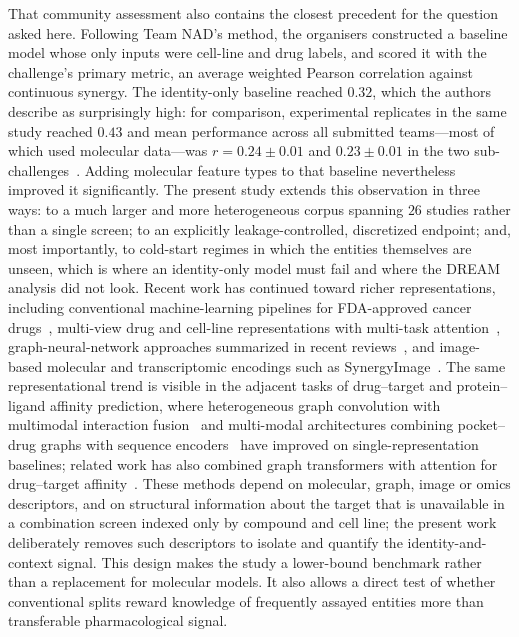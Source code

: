 \documentclass[11pt]{article}
\begin{document}
That community assessment also contains the closest precedent for the question asked here. Following
Team NAD's method, the organisers constructed a baseline model whose only inputs were cell-line and
drug labels, and scored it with the challenge's primary metric, an average weighted Pearson correlation
against continuous synergy. The identity-only baseline reached $0.32$, which the authors describe as
surprisingly high: for comparison, experimental replicates in the same study reached $0.43$ and mean
performance across all submitted teams---most of which used molecular data---was
$r = 0.24 \pm 0.01$ and $0.23 \pm 0.01$ in the two sub-challenges~\cite{menden2019}. Adding molecular
feature types to that baseline nevertheless improved it significantly. The present study extends this
observation in three ways: to a much larger and more heterogeneous corpus spanning $26$ studies rather
than a single screen; to an explicitly leakage-controlled, discretized endpoint; and, most importantly,
to cold-start regimes in which the entities themselves are unseen, which is where an identity-only
model must fail and where the DREAM analysis did not look. Recent work has
continued toward richer representations, including conventional machine-learning pipelines for
FDA-approved cancer drugs~\cite{abdelhafeez2024}, multi-view drug and cell-line representations with
multi-task attention~\cite{monem2024}, graph-neural-network approaches summarized in recent
reviews~\cite{besharatifard2024}, and image-based molecular and transcriptomic encodings such as
SynergyImage~\cite{mehrabani2025}. The same representational trend is visible in the adjacent tasks of
drug--target and protein--ligand affinity prediction, where heterogeneous graph convolution with
multimodal interaction fusion~\cite{wang2026ihgcn} and multi-modal architectures combining
pocket--drug graphs with sequence encoders~\cite{wang2025mmpd} have improved on single-representation
baselines; related work has also combined graph transformers with attention for drug--target
affinity~\cite{monem2024}. These methods depend on molecular, graph, image or omics
descriptors, and on structural information about the target that is unavailable in a combination
screen indexed only by compound and cell line; the present work deliberately removes such descriptors
to isolate and quantify the identity-and-context signal. This design makes the study a lower-bound benchmark rather than a
replacement for molecular models. It also allows a direct test of whether conventional splits reward
knowledge of frequently assayed entities more than transferable pharmacological signal.
\end{document}
